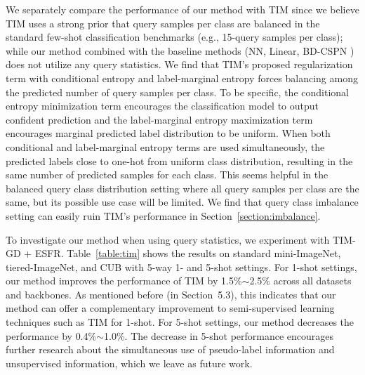 \documentclass{article}
\begin{document}
We separately compare the performance of our method with TIM \cite{TIM} since we believe TIM uses a strong prior that query samples per class are balanced in the standard few-shot classification benchmarks (e.g., 15-query samples per class); while our method combined with the baseline methods (NN, Linear, BD-CSPN \cite{BDCSPN}) does not utilize any query statistics.
We find that TIM's proposed regularization term with conditional entropy and label-marginal entropy forces balancing among the predicted number of query samples per class.
To be specific, the conditional entropy minimization term encourages the classification model to output confident prediction and the label-marginal entropy maximization term encourages marginal predicted label distribution to be uniform.
When both conditional and label-marginal entropy terms are used simultaneously, the predicted labels close to one-hot from uniform class distribution, resulting in the same number of predicted samples for each class.
This seems helpful in the balanced query class distribution setting where all query samples per class are the same, but its possible use case will be limited.
We find that query class imbalance setting can easily ruin TIM's performance in Section~\ref{section:imbalance}.

To investigate our method when using query statistics, we experiment with TIM-GD + ESFR.
Table~\ref{table:tim} shows the results on standard mini-ImageNet, tiered-ImageNet, and CUB with 5-way 1- and 5-shot settings.
For 1-shot settings, our method improves the performance of TIM by 1.5\%$\sim$2.5\% across all datasets and backbones.
As mentioned before (in Section~5.3), this indicates that our method can offer a complementary improvement to semi-supervised learning techniques such as TIM for 1-shot.
For 5-shot settings, our method decreases the performance by 0.4\%$\sim$1.0\%.
The decrease in 5-shot performance encourages further research about the simultaneous use of pseudo-label information and unsupervised information, which we leave as future work.
\end{document}
